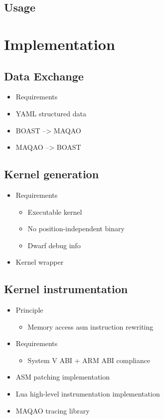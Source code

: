 \documentclass[11pt, a4paper, twoside]{montblanc2}
\begin{document}
  \subsection{Usage}

\section{Implementation}

\subsection{Data Exchange}

\begin{itemize}
  \item Requirements
  \item YAML structured data
  \item BOAST --> MAQAO
  \item MAQAO --> BOAST
\end{itemize}

\subsection{Kernel generation}

\begin{itemize}
  \item Requirements
    \begin{itemize}
      \item Executable kernel
      \item No position-independent binary
      \item Dwarf debug info
    \end{itemize}
  \item Kernel wrapper
\end{itemize}

\subsection{Kernel instrumentation}

\begin{itemize}
  \item Principle
    \begin{itemize}
      \item Memory access asm instruction rewriting
    \end{itemize}
  \item Requirements
    \begin{itemize}
      \item System V ABI + ARM ABI compliance
    \end{itemize}
  \item ASM patching implementation
  \item Lua high-level instrumentation implementation
  \item MAQAO tracing library
\end{itemize}
\end{document}
